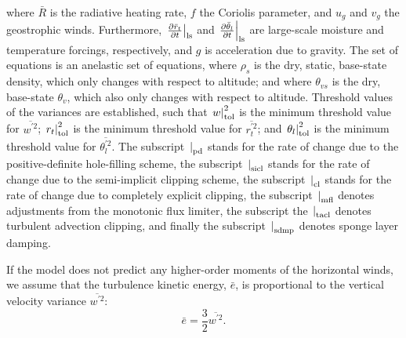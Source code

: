 \documentclass[11pt,fleqn]{article}
\newcommand{\ptlder}[2]{\frac{\partial #1}{\partial #2}}
\begin{document}
%
where $\bar{R}$ is the radiative heating rate, $f$ the Coriolis parameter, and
$u_g$ and $v_g$ the geostrophic winds.  Furthermore,
$\left. \ptlder{\bar{r}_t}{t} \right|_{\rm ls}$ and
$\left. \ptlder{\bar{\theta}_l}{t} \right|_{\rm ls}$ are large-scale moisture
and temperature forcings, respectively, and $g$ is acceleration due to gravity.   The set of
equations is an anelastic set of equations, where $\rho_{s}$ is the dry, static,
base-state density, which only changes with respect to altitude; and where
$\theta_{vs}$ is the dry, base-state $\theta_{v}$, which also only changes with
respect to altitude.  Threshold values of the variances are established, such that
$\left. w \right|_{\rm{tol}}^{2}$ is the minimum threshold value for
$\overline{w^{'2}}$;  $\left. r_t \right|_{\rm{tol}}^{2}$ is the minimum
threshold value for $\overline{r_t^{'2}}$; and 
$\left. \theta_l \right|_{\rm{tol}}^{2}$ is the minimum threshold value for
$\overline{\theta_l^{'2}}$.  The subscript $\left.\right|_{\rm{pd}}$ stands for
the rate of change due to the positive-definite hole-filling scheme, the
subscript $\left.\right|_{\rm{sicl}}$ stands for the rate of change due to the
semi-implicit clipping scheme, the subscript $\left.\right|_{\rm{cl}}$
stands for the rate of change due to completely explicit clipping,  the subscript 
$\left.\right|_{\rm{mfl}}$ denotes adjustments from the monotonic flux limiter, the subscript
the $\left.\right|_{\rm{tacl}}$  denotes turbulent advection clipping, and finally the subscript
$\left.\right|_{\rm{sdmp}}$ denotes sponge layer damping.


If the model does not predict any higher-order moments of the
horizontal winds, we assume that the turbulence kinetic energy, $\bar{e}$,
is proportional to the vertical velocity variance $\overline{w^{'2}}$:
%
\begin{equation}
\label{eq_tke}
\bar{e} = \frac{3}{2} \overline{w^{'2}}.
\end{equation}
%
\end{document}
